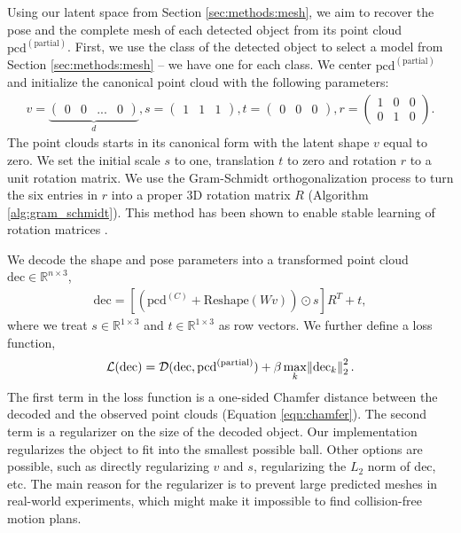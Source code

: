 \documentclass{article}
\newcommand{\pcx}[1]{\mathrm{pcd}^{(#1)}}
\newcommand{\pcc}{\pcx{C}}
\begin{document}
Using our latent space from Section \ref{sec:methods:mesh}, we aim to recover the pose and the complete mesh of each detected object from its point cloud $\mathrm{pcd}^{\mathrm{(partial)}}$. First, we use the class of the detected object to select a model from Section \ref{sec:methods:mesh} -- we have one for each class. We center $\mathrm{pcd}^{\mathrm{(partial)}}$ and initialize the canonical point cloud with the following parameters:
\begin{align}
    v = \underbrace{\begin{pmatrix} 0 & 0 & ... & 0 \end{pmatrix}}_d, s = \begin{pmatrix} 1 & 1 & 1 \end{pmatrix}, t = \begin{pmatrix} 0 & 0 & 0 \end{pmatrix}, r = \begin{pmatrix} 1 & 0 & 0 \\ 0 & 1 & 0 \end{pmatrix}.
\end{align}
The point clouds starts in its canonical form with the latent shape $v$ equal to zero. We set the initial scale $s$ to one, translation $t$ to zero and rotation $r$ to a unit rotation matrix. We use the Gram-Schmidt orthogonalization process to turn the six entries in $r$ into a proper 3D rotation matrix $R$ (Algorithm \ref{alg:gram_schmidt}). This method has been shown to enable stable learning of rotation matrices \cite{falorsi18explorations, park22learning}.

We decode the shape and pose parameters into a transformed point cloud $\mathrm{dec} \in \mathbb{R}^{n \times 3}$,
\begin{align}
    \mathrm{dec} = [(\pcc + \mathrm{Reshape}(W v)) \odot s] R^T + t,
\end{align}
where we treat $s \in \mathbb{R}^{1 \times 3}$ and $t \in \mathbb{R}^{1 \times 3}$ as row vectors.
We further define a loss function,
\begin{align}
    \mathcal{L}(\mathrm{dec}) = \mathcal{D}(\mathrm{dec}, \mathrm{pcd}^{\mathrm{(partial)}}) + \beta \max_k \norm{\mathrm{dec}_k}_2^2.
\end{align}
The first term in the loss function is a one-sided Chamfer distance between the decoded and the observed point clouds (Equation \ref{eqn:chamfer}). The second term is a regularizer on the size of the decoded object. Our implementation regularizes the object to fit into the smallest possible ball. Other options are possible, such as directly regularizing $v$ and $s$, regularizing the $L_2$ norm of $\mathrm{dec}$, etc. The main reason for the regularizer is to prevent large predicted meshes in real-world experiments, which might make it impossible to find collision-free motion plans.
\end{document}
